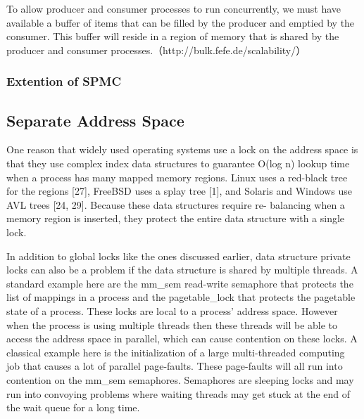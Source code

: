To allow producer and consumer processes to run concurrently, we must have
available a buffer of items that can be filled by the producer and emptied by
the consumer. This buffer will reside in a region of memory that is shared by
the producer and consumer processes.（http://bulk.fefe.de/scalability/）

\subsubsection{Extention of SPMC}





\subsection{Separate Address Space}

One reason that widely used operating systems use a lock on the address space is that 
they use complex index data structures to guarantee O(log n)
lookup time when a process has many mapped memory
regions. Linux uses a red-black tree for the regions [27],
FreeBSD uses a splay tree [1], and Solaris and Windows use
AVL trees [24, 29]. 
Because these data structures require re-
balancing when a memory region is inserted, they protect the
entire data structure with a single lock.


In addition to global locks like the ones discussed earlier, 
data structure private locks can also be a problem 
if the data structure is shared by multiple threads. 
A standard example here are the mm\_sem read-write semaphore 
that protects the list of mappings in a process and 
the pagetable\_lock that protects the pagetable state of a process. 
These locks are local to a process’ address space. 
However when the process is using multiple threads 
then these threads will be able to access the address space in parallel,
which can cause contention on these locks. 
A classical example here is 
the initialization of a large multi-threaded computing job 
that causes a lot of parallel page-faults. 
These page-faults will all run into contention on the mm\_sem semaphores. Semaphores are sleeping locks 
and may run into convoying problems 
where waiting threads may 
get stuck at the end of the wait queue for a long time.\cite{Andi2009lmulticore}

